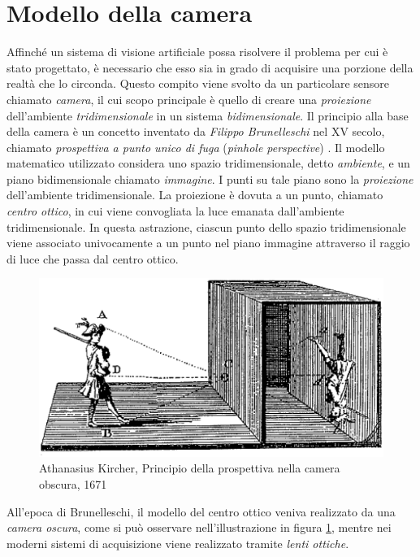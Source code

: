 \section{Modello della camera}
\label{modelloCamera}
Affinch\'e un sistema di visione artificiale possa risolvere il problema per cui \`e stato progettato, \`e necessario che esso sia in grado di acquisire una porzione della realt\`a che lo circonda.
Questo compito viene svolto da un particolare sensore chiamato \textit{camera}, il cui scopo principale \`e quello di creare una \textit{proiezione} dell'ambiente \textit{tridimensionale} in un sistema \textit{bidimensionale}.
Il principio alla base della camera \`e un concetto inventato da \textit{Filippo Brunelleschi} nel XV secolo, chiamato \textit{prospettiva a punto unico di fuga} (\textit{pinhole perspective}) \cite{manetti1976vita}.
Il modello matematico utilizzato considera uno spazio tridimensionale, detto \textit{ambiente}, e un piano bidimensionale chiamato \textit{immagine}. 
I punti su tale piano sono la \textit{proiezione} dell'ambiente tridimensionale.
La proiezione \`e dovuta a un punto, chiamato \textit{centro ottico}, in cui viene convogliata la luce emanata dall'ambiente tridimensionale.
In questa astrazione, ciascun punto dello spazio tridimensionale viene associato univocamente a un punto nel piano immagine attraverso il raggio di luce che passa dal centro ottico.
\begin{figure}[tb]
	\centering
	\includegraphics[width=12cm]{./pictures/cameraObscura}
	\caption{Athanasius Kircher, Principio della prospettiva nella camera obscura, 1671}
	\label{fig:prospettiva}
\end{figure} 
All'epoca di Brunelleschi, il modello del centro ottico veniva realizzato da una \textit{camera oscura}, come si pu\`o osservare nell'illustrazione in figura \ref{fig:prospettiva}, mentre nei moderni sistemi di acquisizione viene realizzato tramite \textit{lenti ottiche}. 
